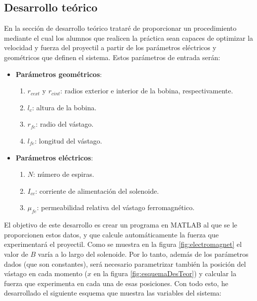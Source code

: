 \subsection{Desarrollo teórico}
\label{subsec:desarrollo}
En la sección de desarrollo teórico trataré de proporcionar un procedimiento mediante el cual los alumnos que realicen la práctica sean capaces de optimizar la velocidad y fuerza del proyectil a partir de los parámetros eléctricos y geométricos que definen el sistema. Estos parámetros de entrada serán:
\begin{itemize}
    \item \textbf{Parámetros geométricos}:
    \begin{enumerate}[label=\alph*., leftmargin=*, itemindent=1em]
        \item \(r_{cext}\) y \(r_{cint} \): radios exterior e interior de la bobina, respectivamente.
        \item \(l_c\): altura de la bobina.
        \item \(r_{fe}\): radio del vástago.
        \item \(l_{fe}\): longitud del vástago.
    \end{enumerate}
    \item \textbf{Parámetros eléctricos}:
    \begin{enumerate}[label=\alph*., leftmargin=*, itemindent=1em]
        \item \(N\): número de espiras.
        \item \(I_{cc}\): corriente de alimentación del solenoide.
        \item \(\mu_{fe}\): permeabilidad relativa del vástago ferromagnético.
    \end{enumerate}
\end{itemize}

El objetivo de este desarrollo es crear un programa en MATLAB al que se le proporcionen estos datos, y que calcule automáticamente la fuerza que experimentará el proyectil. Como se muestra en la figura \ref{fig:electromagnet} el valor de
\(B\) varía a lo largo del solenoide. Por lo tanto, además de los parámetros dados (que son constantes), será necesario parametrizar también la posición del vástago en cada momento (\(x\) en la figura \ref{fig:esquemaDesTeor}) y calcular la fuerza que experimenta en cada una de esas posiciones. Con todo esto, he desarrollado el siguiente esquema que muestra las variables del sistema:

